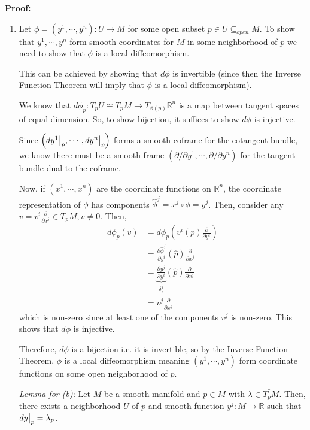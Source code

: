 \documentclass{article}
\newcommand{\R}{\mathbb{R}}
\newcommand{\restr}[2]{{%
  \left.\kern-\nulldelimiterspace %
  #1 %
  \vphantom{\big|} %
  \right|_{#2} %
  }}
\begin{document}
\vskip 0.5cm
\textbf{Proof:}

\begin{enumerate}[label=(\alph*)]
  \item Let $\phi = \left(y^1, \cdots, y^n\right) : U \rightarrow M$ for some open subset $p \in U \subseteq_{open} M$. To show that $y^1, \cdots, y^n$ form smooth coordinates for $M$ in some neighborhood of $p$ we need to show that $\phi$ is a local diffeomorphism.
  
  
  This can be achieved by showing that $d\phi$ is invertible (since then the Inverse Function Theorem will imply that $\phi$ is a local diffeomorphism). 


  We know that $d\phi_p : T_{p} U \cong T_{p} M \rightarrow T_{\phi(p)} \R^n$ is a map between tangent spaces of equal dimension. So, to show bijection, it suffices to show $d\phi$ is injective.


  Since $\left(\restr{dy^1}{p}, \cdots, \restr{dy^n}{p}\right)$ forms a smooth coframe for the cotangent bundle, we know there must be a smooth frame $\left( \partial / \partial y^1, \cdots, \partial / \partial y^n \right)$ for the tangent bundle dual to the coframe. 

  Now, if $\left(x^1, \cdots, x^n\right)$ are the coordinate functions on $\R^n$, the coordinate representation of $\phi$ has components $\hat{\phi}^j = x^j \circ \phi = y^j$. Then, consider any $v = v^i \frac{\partial}{\partial x^i} \in T_pM, v \neq 0$. Then, 
  \begin{align*}
    d\phi_p(v) &= d\phi_p \left(v^i(p) \frac{\partial}{\partial y^i} \right) \\
    &= \frac{\partial \hat{\phi}^j}{\partial y^i}(\hat{p}) \frac{\partial}{\partial x^j} \\
    &= \underbrace{\frac{\partial y^j}{\partial y^i}}_{\delta^j_i}(\hat{p}) \frac{\partial}{\partial x^j} \\
    &=v^j \frac{\partial}{\partial x^j}
  \end{align*}
  which is non-zero since at least one of the components $v^j$ is non-zero. This shows that $d\phi$ is injective.

  Therefore, $d\phi$ is a bijection i.e. it is invertible, so by the Inverse Function Theorem, $\phi$ is a local diffeomorphism meaning $\left(y^1, \cdots, y^n\right)$ form coordinate functions on some open neighborhood of $p$.

  \vskip 0.5cm
  \begin{dottedbox}
    \emph{Lemma for (b):} Let $M$ be a smooth manifold and $p \in M$ with $\lambda \in T_p^*M$. Then, there exists a neighborhood $U$ of $p$ and smooth function $y^j : M \rightarrow \R$ such that $\restr{dy}{p} = \lambda_p$.


\end{dottedbox}
\end{enumerate}
\end{document}
